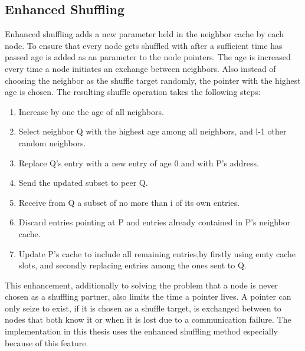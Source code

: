 \subsection{Enhanced Shuffling}
Enhanced shuffling adds a new parameter held in the neighbor cache by each node.
To ensure that every node gets shuffled with after a sufficient time has passed
age is added as an parameter to the node pointers. The age is increased every
time a node initiates an exchange between neighbors. Also instead of choosing
the neighbor as the shuffle target randomly, the pointer with the highest
age is chosen. The resulting shuffle operation takes the following steps:

\begin{enumerate}
\item Increase by one the age of all neighbors.
\item Select neighbor Q with the highest age among all neighbors, and l-1 other
random neighbors.
\item Replace Q's entry with a new entry of age 0 and with P's address.
\item Send the updated subset to peer Q.
\item Receive from Q a subset of no more than i of its own entries.
\item Discard entries pointing at P and entries already contained in P's
neighbor cache.
\item Update P's cache to include all remaining entries,by firstly using emty
cache slots, and secondly replacing entries among the ones sent to Q.
\end{enumerate}

This enhancement, additionally to solving the problem that a node is never
chosen as a shuffling partner, also limits the time a pointer lives. A pointer
can only seize to exist, if it is chosen as a shuffle target, is exchanged
between to nodes that both know it or when it is lost due to a communication
failure. The implementation in this thesis uses the enhanced shuffling method
especially because of this feature.
